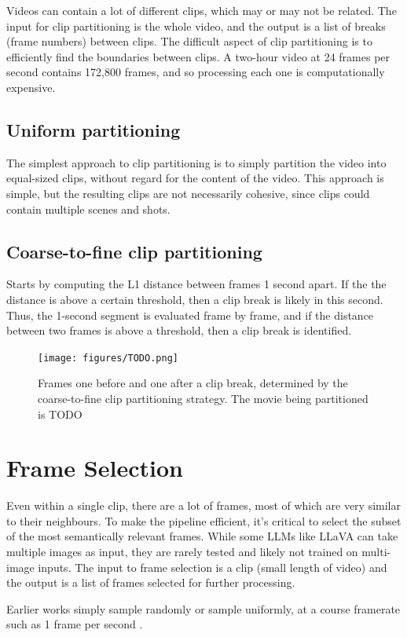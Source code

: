 Videos can contain a lot of different clips, which may or may not be related.
The input for clip partitioning is the whole video, and the output is a list of breaks (frame numbers) between clips.
The difficult aspect of clip partitioning is to efficiently find the boundaries between clips.
A two-hour video at 24 frames per second contains 172,800 frames, and so processing each one is computationally expensive.
\subsection{Uniform partitioning}
The simplest approach to clip partitioning is to simply partition the video into equal-sized clips, without regard for the content of the video.
This approach is simple, but the resulting clips are not necessarily cohesive, since clips could contain multiple scenes and shots.
\subsection{Coarse-to-fine clip partitioning}
Starts by computing the L1 distance between frames 1 second apart.
If the the distance is above a certain threshold, then a clip break is likely in this second.
Thus, the 1-second segment is evaluated frame by frame, and if the distance between two frames is above a threshold, then a clip break is identified.

\begin{figure}
      \centering
      \texttt{[image: figures/TODO.png]}
      \caption{Frames one before and one after a clip break, determined by the coarse-to-fine clip partitioning strategy. The movie being partitioned is TODO}
      \label{fig:breaks}
\end{figure}


\section{Frame Selection}

Even within a single clip, there are a lot of frames, most of which are very similar to their neighbours.
To make the pipeline efficient, it's critical to select the subset of the most semantically relevant frames.
While some LLMs like LLaVA can take multiple images as input, they are rarely tested and likely not trained on multi-image inputs.
The input to frame selection is a clip (small length of video) and the output is a list of frames selected for further processing.

Earlier works simply sample randomly \cite{clipbert} or sample uniformly, at a course framerate such as 1 frame per second \cite{clip4clip}.

